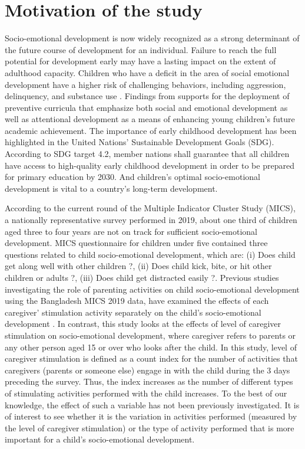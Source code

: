 \documentclass[
  12pt,
  oneside]{report}
\begin{document}
\hypertarget{motivation-of-the-study}{%
\section{Motivation of the study}\label{motivation-of-the-study}}

Socio-emotional development is now widely recognized as a strong determinant of the future course of development for an individual. Failure to reach the full potential for development early may have a lasting impact on the extent of adulthood capacity. Children who have a deficit in the area of social emotional development have a higher risk of challenging behaviors, including aggression, delinquency, and substance use \citep{domitrovich2017social}. Findings from \citep{rhoades2011examining} supports for the deployment of preventive curricula that emphasize both social and emotional development as well as attentional development as a means of enhancing young children's future academic achievement. The importance of early childhood development has been highlighted in the United Nations' Sustainable Development Goals (SDG). According to SDG target 4.2, member nations shall guarantee that all children have access to high-quality early childhood development in order to be prepared for primary education by 2030. And children's optimal socio-emotional development is vital to a country's long-term development.

According to the current round of the Multiple Indicator Cluster Study (MICS), a nationally representative survey performed in 2019, about one third of children aged three to four years are not on track for sufficient socio-emotional development. MICS questionnaire for children under five contained three questions related to child socio-emotional development, which are: (i) Does child get along well with other children ?, (ii) Does child kick, bite, or hit other children or adults ?, (iii) Does child get distracted easily ?. Previous studies investigating the role of parenting activities on child socio-emotional development using the Bangladesh MICS 2019 data, have examined the effects of each caregiver' stimulation activity separately on the child's socio-emotional development \citep{alam2021early}. In contrast, this study looks at the effects of level of caregiver stimulation on socio-emotional development, where caregiver refers to parents or any other person aged 15 or over who looks after the child. In this study, level of caregiver stimulation is defined as a count index for the number of activities that caregivers (parents or someone else) engage in with the child during the 3 days preceding the survey. Thus, the index increases as the number of different types of stimulating activities performed with the child increases. To the best of our knowledge, the effect of such a variable has not been previously investigated. It is of interest to see whether it is the variation in activities performed (measured by the level of caregiver stimulation) or the type of activity performed that is more important for a child's socio-emotional development.
\end{document}
